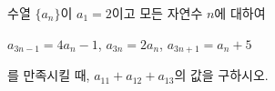 수열 $\{a_n\}$이 $a_1=2$이고 모든 자연수 $n$에 대하여 \par\smallskip\noindent\hspace*{1.5em}$a_{3n-1}=4a_n-1$, $a_{3n}=2a_n$, $a_{3n+1}=a_n+5$\par\smallskip\noindent 를 만족시킬 때, $a_{11}+a_{12}+a_{13}$의 값을 구하시오.
